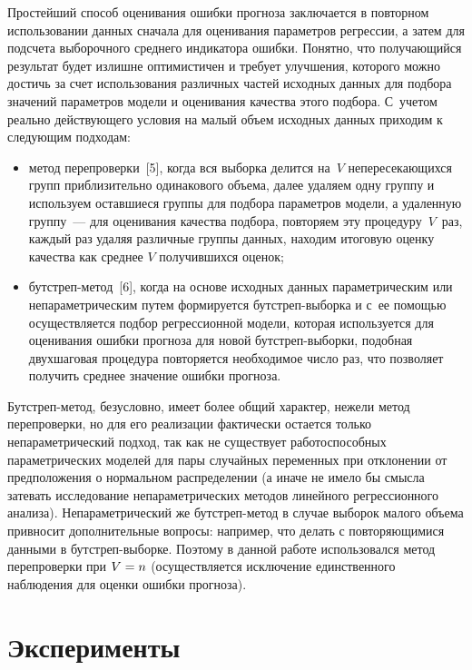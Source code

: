 \begin{multicols}{2}
     Простейший способ оценивания ошибки прогноза заключается в
повторном использовании данных сначала для оценивания параметров
регрессии, а затем для подсчета выборочного среднего индикатора ошибки.
Понятно, что получающийся результат будет излишне оптимистичен и требует
улучшения, которого можно достичь за счет использования различных частей
исходных данных для подбора значений параметров модели и оценивания
качества этого подбора. С~учетом реально действующего условия на малый
объем исходных данных приходим к следующим подходам:
     \begin{itemize}
\item метод перепроверки~[5], когда вся выборка делится на~$V$
непересекающихся групп приблизительно одинакового объема, далее
удаляем одну группу и используем оставшиеся группы для подбора
параметров модели, а удаленную группу~--- для оценивания качества
подбора, повторяем эту процедуру~$V$~раз, каждый раз удаляя различные
группы данных, находим итоговую оценку качества как среднее $V$
получившихся оценок;
\item бутстреп-ме\-тод~[6], когда на основе исходных данных
параметрическим или непараметрическим путем формируется
бут\-стреп-вы\-бор\-ка и с~ее помощью осуществляется подбор
регрессионной модели, которая используется для оценива\-ния ошибки
прогноза для новой
бут\-стреп-вы\-бор\-ки, подобная двухшаговая процедура повторяется
необходимое число раз, что позволяет получить среднее значение ошибки
прогноза.
\end{itemize}

     Бутстреп-метод, безусловно, имеет более общий характер, нежели метод
перепроверки, но для его реализации фактически остается только
непараметрический подход, так как не существует работоспособных
параметрических моделей для пары случайных переменных при отклонении от
предположения о нормальном распределении (а иначе не имело бы смыс\-ла
затевать исследование непараметрических методов линейного регрессионного
анализа). Непараметрический же бутстреп-метод в случае выборок малого
объема привносит дополнительные вопросы: например, что делать с
повторяющимися данными в бут\-стреп-вы\-бор\-ке. Поэтому в данной работе
использовался метод перепроверки при $V\hm=n$ (осуществляется исключение
единственного наблюдения для оценки ошибки прогноза).

\section{Эксперименты}


\end{multicols}
